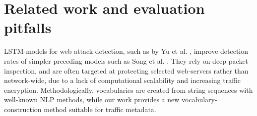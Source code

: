 \section{Related work and evaluation pitfalls}\label{Sec:Related work}






LSTM-models for web attack detection, such as by Yu et al. \cite{yu2018attention}, improve detection rates of simpler preceding models such as Song et al. \cite{song2009spectrogram}. They rely on deep packet inspection, and are often targeted at protecting selected web-servers rather than network-wide, due to a lack of computational scalability and increasing traffic encryption. Methodologically, vocabularies are created from string sequences with well-known NLP methods, while our work provides a new vocabulary-construction method suitable for traffic metadata.


